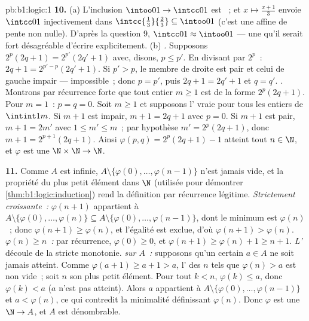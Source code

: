 \begin{solution}{pb:b1:logic:1}
\textbf{10.} (a) L'inclusion $\intoo01 \to \intcc01$ est ~;
et $x \mapsto \frac{x + 1}3$ envoie $\intcc01$ injectivement dans
$\intcc{\frac13}{\frac23} \subseteq \intoo01$ (c'est une 
affine de pente non nulle). D'après la question 9, $\intcc01 \approx
\intoo01$ --- une  qu'il serait fort désagréable d'écrire
explicitement.
(b) \emph{.} Supposons $2^p(2q + 1) = 2^{p'}(2q' + 1)$ avec,
disons, $p \leq p'$. En divisant par $2^p$~: $2q + 1 = 2^{p' - p}(2q' +
1)$. Si $p' > p$, le membre de droite est pair et celui de gauche
impair --- impossible~; donc $p = p'$, puis $2q + 1 = 2q' + 1$ et
$q = q'$. \emph{.} Montrons par récurrence forte que tout
entier $m \geq 1$ est de la forme $2^p(2q + 1)$. Pour $m = 1$~:
$p = q = 0$. Soit $m \geq 1$ et supposons l' vraie pour tous
les entiers de $\intint1m$. Si $m + 1$ est impair, $m + 1 = 2q + 1$
avec $p = 0$. Si $m + 1$ est pair, $m + 1 = 2m'$ avec $1 \leq m' \leq
m$~; par hypothèse $m' = 2^p(2q + 1)$, donc $m + 1 = 2^{p+1}(2q + 1)$.
Ainsi $\varphi(p, q) = 2^p(2q + 1) - 1$ atteint tout $n \in \N$, et
$\varphi$ est une  $\N \times \N \to \N$.

\textbf{11.} Comme $A$ est infinie, $A \setminus \{\varphi(0), \dots,
\varphi(n - 1)\}$ n'est jamais vide, et la propriété du plus petit
élément dans $\N$ (utilisée pour démontrer
\cref{thm:b1:logic:induction}) rend la définition par récurrence
légitime. \emph{Strictement croissante~:} $\varphi(n + 1)$ appartient
à $A \setminus \{\varphi(0), \dots, \varphi(n)\} \subseteq A \setminus
\{\varphi(0), \dots, \varphi(n - 1)\}$, dont le minimum est
$\varphi(n)$~; donc $\varphi(n + 1) \geq \varphi(n)$, et l'égalité est
exclue, d'où $\varphi(n+1) > \varphi(n)$. \emph{$\varphi(n) \geq n$~:}
par récurrence, $\varphi(0) \geq 0$, et $\varphi(n + 1) \geq \varphi(n)
+ 1 \geq n + 1$. \emph{L'} découle de la stricte
monotonie. \emph{ sur $A$~:} supposons qu'un certain
$a \in A$ ne soit jamais atteint. Comme $\varphi(a + 1) \geq a + 1 >
a$, l' des $n$ tels que $\varphi(n) > a$ est non vide~; soit
$n$ son plus petit élément. Pour tout $k < n$, $\varphi(k) \leq a$,
donc $\varphi(k) < a$ ($a$ n'est pas atteint). Alors $a$ appartient à
$A \setminus \{\varphi(0), \dots, \varphi(n - 1)\}$ et $a < \varphi(n)$,
ce qui contredit la minimalité définissant $\varphi(n)$. Donc $\varphi$
est une  $\N \to A$, et $A$ est dénombrable.


\end{solution}
